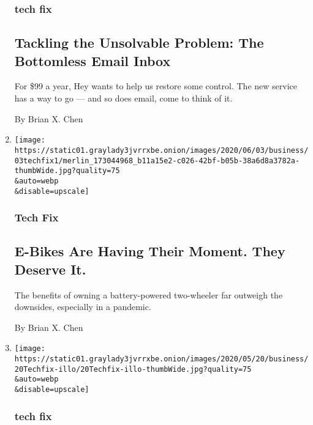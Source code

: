 \begin{enumerate}
  \hypertarget{tech-fix-4}{%
  \subsubsection{tech fix}\label{tech-fix-4}}

  \hypertarget{tackling-the-unsolvable-problem-the-bottomless-email-inbox}{%
  \subsection{Tackling the Unsolvable Problem: The Bottomless Email
  Inbox}\label{tackling-the-unsolvable-problem-the-bottomless-email-inbox}}

  For \$99 a year, Hey wants to help us restore some control. The new
  service has a way to go --- and so does email, come to think of it.

  By Brian X. Chen
\item
  \href{/2020/06/03/technology/personaltech/e-bikes-are-having-their-moment-they-deserve-it.html}{}

  \texttt{[image: https://static01.graylady3jvrrxbe.onion/images/2020/06/03/business/03techfix1/merlin\_173044968\_b11a15e2-c026-42bf-b05b-38a6d8a3782a-thumbWide.jpg?quality=75\\\&auto=webp\\\&disable=upscale]}

  \hypertarget{tech-fix-5}{%
  \subsubsection{Tech Fix}\label{tech-fix-5}}

  \hypertarget{e-bikes-are-having-their-moment-they-deserve-it}{%
  \subsection{E-Bikes Are Having Their Moment. They Deserve
  It.}\label{e-bikes-are-having-their-moment-they-deserve-it}}

  The benefits of owning a battery-powered two-wheeler far outweigh the
  downsides, especially in a pandemic.

  By Brian X. Chen
\item
  \href{/2020/05/20/technology/personaltech/slow-internet-speeds.html}{}

  \texttt{[image: https://static01.graylady3jvrrxbe.onion/images/2020/05/20/business/20Techfix-illo/20Techfix-illo-thumbWide.jpg?quality=75\\\&auto=webp\\\&disable=upscale]}

  \hypertarget{tech-fix-6}{%
  \subsubsection{tech fix}\label{tech-fix-6}}


\end{enumerate}
